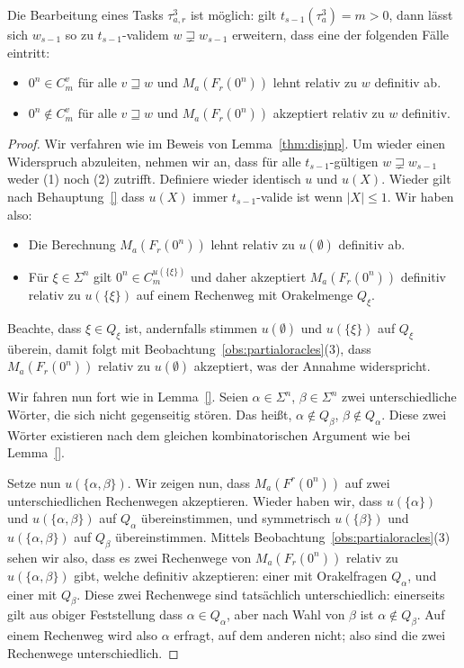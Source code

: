 
\begin{lemma}
    Die Bearbeitung eines Tasks $\tau^3_{a,r}$ ist möglich: gilt $t_{s-1}(\tau^3_{a})=m>0$, dann lässt sich $w_{s-1}$ so zu $t_{s-1}$-validem $w\sqsupsetneq w_{s-1}$ erweitern, dass eine der folgenden Fälle eintritt:
        \begin{itemize}[nosep,endpenalty=10000]
            \item $0^n\in C_m^v$ für alle $v\sqsupseteq w$ und $M_a(F_r(0^n))$ lehnt relativ zu $w$ definitiv ab.
            \item $0^n\not\in C_m^v$ für alle $v\sqsupseteq w$ und $M_a(F_r(0^n))$ akzeptiert relativ zu $w$ definitiv.
        \end{itemize}
\end{lemma}
\begin{proof}
Wir verfahren wie im Beweis von Lemma~\ref{thm:disjnp}.
Um wieder einen Widerspruch abzuleiten, nehmen wir an, dass für alle $t_{s-1}$-gültigen $w\sqsupsetneq w_{s-1}$ weder (1) noch (2) zutrifft.
Definiere wieder identisch $u$ und $u(X)$.
Wieder gilt nach Behauptung~\ref{} dass $u(X)$ immer $t_{s-1}$-valide ist wenn $|X|\leq 1$.
Wir haben also:
\begin{itemize}[noitemsep]
    \item Die Berechnung $M_a(F_r(0^n))$ lehnt relativ zu $u(\emptyset)$ definitiv ab.
    \item Für $\xi\in \Sigma^{n}$ gilt $0^n\in C_m^{u(\{\xi\})}$ und daher akzeptiert $M_a(F_r(0^n))$ definitiv relativ zu $u(\{\xi\})$ auf einem Rechenweg mit Orakelmenge $Q_\xi$.
\end{itemize}

Beachte, dass $\xi\in Q_\xi$ ist, andernfalls stimmen $u(\emptyset)$ und $u(\{\xi\})$ auf $Q_\xi$ überein, damit folgt mit Beobachtung~\ref{obs:partialoracles}(3), dass $M_a(F_r(0^n))$ relativ zu $u(\emptyset)$ akzeptiert, was der Annahme widerspricht.

Wir fahren nun fort wie in Lemma~\ref{}.
Seien $\alpha\in\Sigma^{n}$, $\beta\in\Sigma^{n}$ zwei unterschiedliche Wörter, die sich nicht gegenseitig stören. Das heißt, $\alpha\not\in Q_\beta$, $\beta\not\in Q_\alpha$.
Diese zwei Wörter existieren nach dem gleichen kombinatorischen Argument wie bei Lemma~\ref{}.

Setze nun $u(\{\alpha, \beta\})$. Wir zeigen nun, dass $M_a(F^r(0^n))$ auf zwei unterschiedlichen Rechenwegen akzeptieren.
Wieder haben wir, dass $u(\{\alpha\})$ und $u(\{\alpha, \beta\})$ auf $Q_\alpha$ übereinstimmen, und symmetrisch $u(\{\beta\})$ und $u(\{\alpha, \beta\})$ auf $Q_\beta$ übereinstimmen.
Mittels Beobachtung~\ref{obs:partialoracles}(3) sehen wir also, dass es zwei Rechenwege von $M_a(F_r(0^n))$ relativ zu $u(\{\alpha, \beta\})$ gibt, welche definitiv akzeptieren: einer mit Orakelfragen $Q_\alpha$, und einer mit $Q_\beta$.
Diese zwei Rechenwege sind tatsächlich unterschiedlich:
einerseits gilt aus obiger Feststellung dass $\alpha\in Q_\alpha$, aber nach Wahl von $\beta$ ist $\alpha\not\in Q_\beta$. Auf einem Rechenweg wird also $\alpha$ erfragt, auf dem anderen nicht; also sind die zwei Rechenwege unterschiedlich.



\end{proof}
